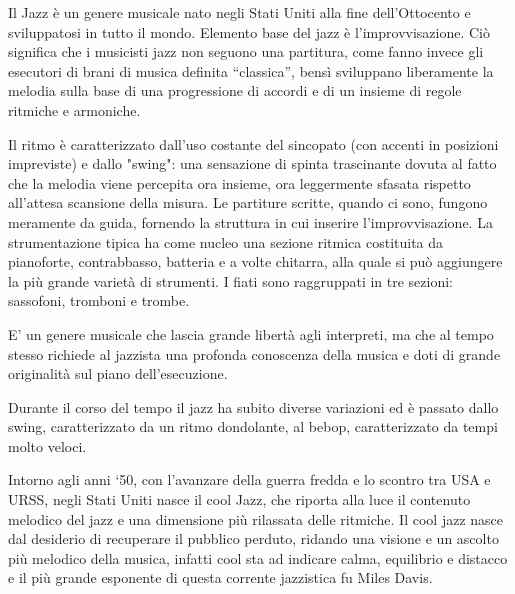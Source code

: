 Il Jazz è un genere musicale nato negli Stati Uniti alla fine dell'Ottocento e sviluppatosi in tutto il mondo. Elemento base del jazz è l’improvvisazione. Ciò significa che i musicisti jazz non seguono una partitura, come fanno invece gli esecutori di brani di musica definita “classica”, bensì sviluppano liberamente la melodia sulla base di una progressione di accordi e di un insieme di regole ritmiche e armoniche.

Il ritmo è caratterizzato dall'uso costante del sincopato (con accenti in posizioni impreviste) e dallo "swing": una sensazione di spinta trascinante dovuta al fatto che la melodia viene percepita ora insieme, ora leggermente sfasata rispetto all'attesa scansione della misura. Le partiture scritte, quando ci sono, fungono meramente da guida, fornendo la struttura in cui inserire l'improvvisazione.
La strumentazione tipica ha come nucleo una sezione ritmica costituita da pianoforte, contrabbasso, batteria e a volte chitarra, alla quale si può aggiungere la più grande varietà di strumenti. I fiati sono raggruppati in tre sezioni: sassofoni, tromboni e trombe.

E’ un genere musicale che lascia grande libertà agli interpreti, ma che al tempo stesso richiede al jazzista una profonda conoscenza della musica e doti di grande originalità sul piano dell’esecuzione.

Durante il corso del tempo il jazz ha subito diverse variazioni ed è passato dallo swing, caratterizzato da un ritmo dondolante, al bebop, caratterizzato da tempi molto veloci.

Intorno agli anni ‘50, con l’avanzare della guerra fredda e lo scontro tra USA e URSS, negli Stati  Uniti nasce il cool Jazz, che riporta alla luce il contenuto melodico del jazz e una dimensione più rilassata delle ritmiche. Il cool jazz nasce dal desiderio di recuperare il pubblico perduto, ridando una visione e un ascolto più melodico della musica, infatti cool sta ad indicare calma, equilibrio e distacco e il più grande esponente di questa corrente jazzistica fu Miles Davis.
